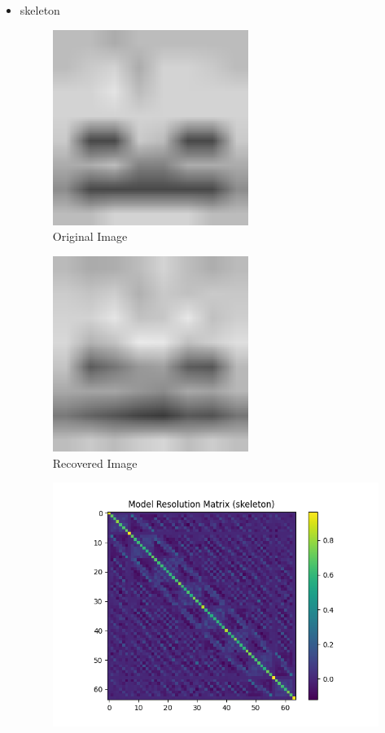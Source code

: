 \documentclass{article}
\begin{document}
\begin{itemize}
    \item skeleton
\begin{figure}[h]
    \centering
    \includegraphics[width=0.6\textwidth]{images/greyscale/skeleton.png}
    \caption{Original Image}
\end{figure}
\begin{figure}[h]
    \centering
    \includegraphics[width=0.6\textwidth]{images/outputs/skeleton.png}
    \caption{Recovered Image}
\end{figure}
\begin{figure}[h]
    \centering
    \includegraphics[width=1\textwidth]{images/outputs/modelres/skeleton.png}

\end{figure}
\end{itemize}
\end{document}
